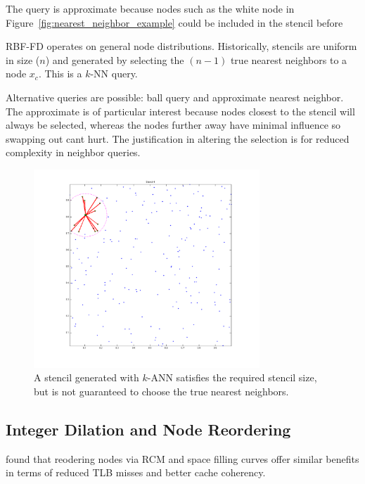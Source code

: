 \documentclass{report}
\begin{document}
The query is approximate because nodes such as the white node in Figure~\ref{fig:nearest_neighbor_example} could be included in the stencil before 


RBF-FD operates on general node distributions. Historically, stencils are uniform in size ($n$) and generated by selecting the $(n-1)$ true nearest neighbors to a node $x_c$. This is a $k$-NN query. 

Alternative queries are possible: ball query and approximate nearest neighbor. The approximate is of particular interest because nodes closest to the stencil will always be selected, whereas the nodes further away have minimal influence so swapping out cant hurt. The justification in altering the selection is for reduced complexity in neighbor queries.  


\begin{figure}
\centering
\includegraphics[width=8.5cm]{rbffd_methods_content/neighbors/neighbor_incorrect.png}
\caption{A stencil generated with $k$-ANN satisfies the required stencil size, but is not guaranteed to choose the true nearest neighbors.}
\label{fig:approximate_nearest_neighbors}
\end{figure}




\subsection{Integer Dilation and Node Reordering}

\cite{MellorCrummey2001} found that reodering nodes via RCM and space filling curves offer similar benefits in terms of reduced TLB misses and better cache coherency. 
\end{document}
